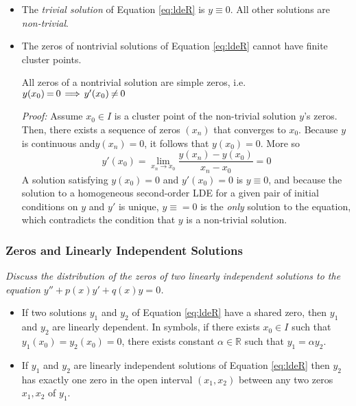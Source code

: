 \documentclass[11pt, a4paper]{article}
\newcommand{\question}[1]{\textit{#1}\vspace{2mm}}
\newcommand{\R}{\mathbb{R}} %
\begin{document}
\begin{itemize}
	\item The \textit{trivial solution} of Equation \ref{eq:ldeR} is $ y \equiv 0 $. All other solutions are \textit{non-trivial}.
	
	\item The zeros of nontrivial solutions of Equation \ref{eq:ldeR} cannot have finite cluster points.
	
	All zeros of a nontrivial solution are simple zeros, i.e. $ y(x_0) \hspace{-0.25mm} =\hspace{-0.25mm}  0 \hspace{-0.5mm} \implies \hspace{-0.5mm}  y'(x_0) \hspace{-0.25mm} \neq\hspace{-0.25mm}  0 $
	
	\vspace{2mm}
	\textit{Proof:} Assume $ x_{0} \in I $ is a cluster point of the non-trivial solution $ y $'s zeros. Then, there exists a sequence of zeros $ (x_{n}) $ that converges to $ x_{0} $. Because $ y $ is continuous and$ y(x_{n}) = 0 $, it follows that $ y(x_{0})  = 0$. More so
	\begin{equation*}
		y'(x_{0}) = \lim_{x_{n} \to x_{0}} \frac{y(x_{n}) - y(x_{0})}{x_{n} - x_{0}} = 0
	\end{equation*}
	A solution satisfying $ y(x_{0}) = 0 $ and $ y'(x_{0}) = 0 $ is $ y \equiv 0 $, and because the solution to a homogeneous second-order LDE for a given pair of initial conditions on $ y $ and $ y' $ is unique, $ y \equiv = 0 $ is the \textit{only} solution to the equation, which contradicts the condition that $ y $ is a non-trivial solution.
	
\end{itemize}




\subsubsection{Zeros and Linearly Independent Solutions}
\question{Discuss the distribution of the zeros of two linearly independent solutions to the equation  $ y'' + p(x)y' + q(x)y = 0 $.}
\begin{itemize}
	\item If two solutions $ y_1 $ and $ y_2 $ of Equation \ref{eq:ldeR} have a shared zero, then $ y_{1} $ and $ y_{2} $ are linearly dependent. In symbols, if there exists $ x_0 \in I $ such that $ y_1(x_0) = y_2(x_0) = 0$, there exists constant $ \alpha \in \R $ such that $ y_1 = \alpha y_2 $.
	
	\item If $ y_1 $ and $ y_2 $ are linearly independent solutions of Equation \ref{eq:ldeR} then $ y_{2} $ has exactly one zero in the open interval $ (x_1, x_2) $ between any two zeros $ x_{1}, x_{2} $ of $ y_{1} $.
\end{itemize}
\end{document}
